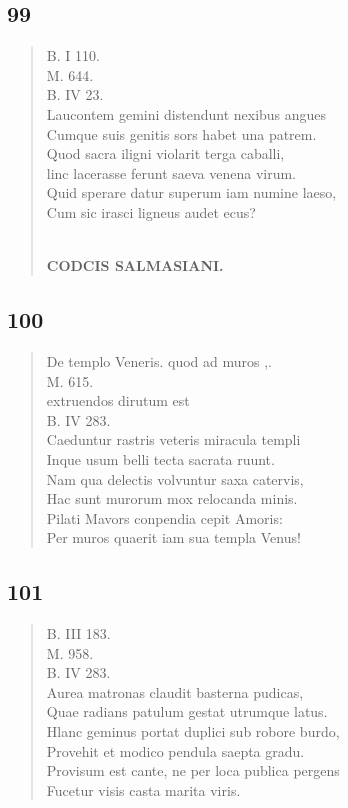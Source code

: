 \documentclass[11pt, a4paper]{report}
\begin{document}
            \subsection*{99}
      \begin{verse}
      B. I 110. \\ M. 644. \\ B. IV 23. \\ Laucontem gemini distendunt nexibus angues \\ Cumque suis genitis sors habet una patrem. \\ Quod sacra iligni violarit terga caballi, \\ linc lacerasse ferunt saeva venena virum. \\ Quid sperare datur superum iam numine laeso, \\ Cum sic irasci ligneus audet ecus? \\ 
        ﻿\pagebreak 
    \begin{center} \textbf{CODCIS SALMASIANI.} \end{center} \marginpar{[0]} 
      \end{verse}
  
            \subsection*{100}
      \begin{verse}
      De templo Veneris. quod ad muros ,. \\ M. 615. \\  \lbrack extruendos dirutum est \rbrack  \\ B. IV 283. \\ Caeduntur rastris veteris miracula templi \\ Inque usum belli tecta sacrata ruunt. \\ Nam qua delectis volvuntur saxa catervis, \\ Hac sunt murorum mox relocanda minis. \\ Pilati Mavors conpendia cepit Amoris: \\ Per muros quaerit iam sua templa Venus! \\ 
      \end{verse}
  
            \subsection*{101}
      \begin{verse}
      B. III 183. \\ M. 958. \\ B. IV 283. \\ Aurea matronas claudit basterna pudicas, \\ Quae radians patulum gestat utrumque latus. \\ Hlanc geminus portat duplici sub robore burdo, \\ Provehit et modico pendula saepta gradu. \\ Provisum est cante, ne per loca publica pergens \\ Fucetur visis casta marita viris. \\ 
      \end{verse}
  
\end{document}
